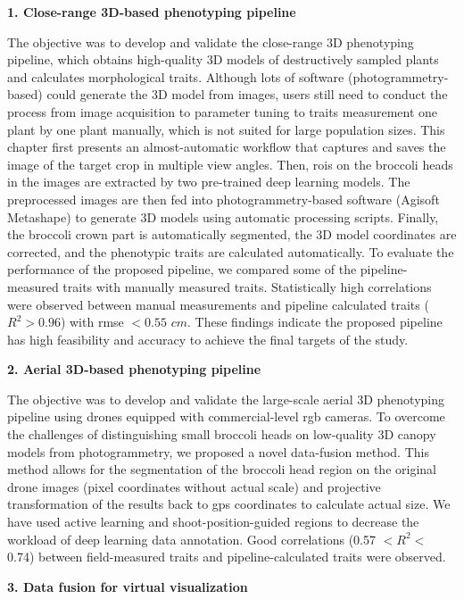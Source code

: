 \begin{doublespace}
\noindent
\textbf{1. Close-range 3D-based phenotyping pipeline}

The objective was to develop and validate the close-range 3D phenotyping pipeline, which obtains high-quality 3D models of destructively sampled plants and calculates morphological traits. Although lots of software (photogrammetry-based) could generate the 3D model from images, users still need to conduct the process from image acquisition to parameter tuning to traits measurement one plant by one plant manually, which is not suited for large population sizes. This chapter first presents an almost-automatic workflow that captures and saves the image of the target crop in multiple view angles. Then, \gls{roi}s on the broccoli heads in the images are extracted by two pre-trained deep learning models. The preprocessed images are then fed into photogrammetry-based software (Agisoft Metashape) to generate 3D models using automatic processing scripts. Finally, the broccoli crown part is automatically segmented, the 3D model coordinates are corrected, and the phenotypic traits are calculated automatically. To evaluate the performance of the proposed pipeline, we compared some of the pipeline-measured traits with manually measured traits. Statistically high correlations were observed between manual measurements and pipeline calculated traits ($R^2>0.96$) with \gls{rmse} $< 0.55$ $cm$. These findings indicate the proposed pipeline has high feasibility and accuracy to achieve the final targets of the study.

\vspace{5mm}
\noindent
\textbf{2. Aerial 3D-based phenotyping pipeline}

The objective was to develop and validate the large-scale aerial 3D phenotyping pipeline using drones equipped with commercial-level \gls{rgb} cameras. To overcome the challenges of distinguishing small broccoli heads on low-quality 3D canopy models from photogrammetry, we proposed a novel data-fusion method. This method allows for the segmentation of the broccoli head region on the original drone images (pixel coordinates without actual scale) and projective transformation of the results back to \gls{gps} coordinates to calculate actual size. We have used active learning and shoot-position-guided regions to decrease the workload of deep learning data annotation. Good correlations (0.57 $<R^2<$ 0.74) between field-measured traits and pipeline-calculated traits were observed.

\vspace{5mm}
\noindent
\textbf{3. Data fusion for virtual visualization}


\end{doublespace}
